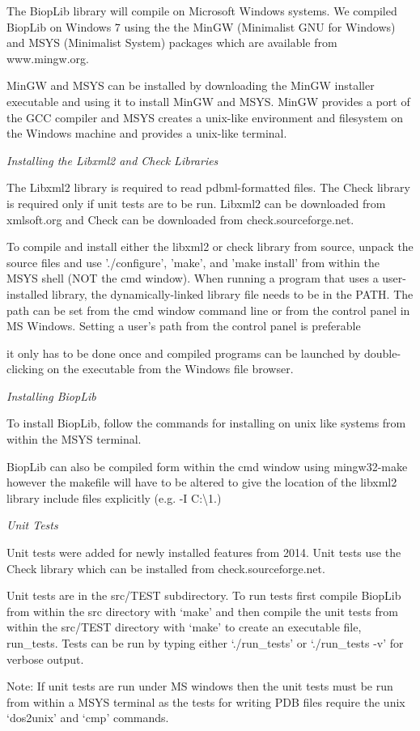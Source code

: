 The Biop\-Lib library will compile on Microsoft Windows systems. We compiled Biop\-Lib on Windows 7 using the the Min\-G\-W (Minimalist G\-N\-U for Windows) and M\-S\-Y\-S (Minimalist System) packages which are available from www.\-mingw.\-org.

Min\-G\-W and M\-S\-Y\-S can be installed by downloading the Min\-G\-W installer executable and using it to install Min\-G\-W and M\-S\-Y\-S. Min\-G\-W provides a port of the G\-C\-C compiler and M\-S\-Y\-S creates a unix-\/like environment and filesystem on the Windows machine and provides a unix-\/like terminal.

{\itshape Installing the Libxml2 and Check Libraries}

The Libxml2 library is required to read pdbml-\/formatted files. The Check library is required only if unit tests are to be run. Libxml2 can be downloaded from xmlsoft.\-org and Check can be downloaded from check.\-sourceforge.\-net.

To compile and install either the libxml2 or check library from source, unpack the source files and use './configure', 'make', and 'make install' from within the M\-S\-Y\-S shell (N\-O\-T the cmd window). When running a program that uses a user-\/installed library, the dynamically-\/linked library file needs to be in the P\-A\-T\-H. The path can be set from the cmd window command line or from the control panel in M\-S Windows. Setting a user's path from the control panel is preferable
\begin{DoxyItemize}
\item it only has to be done once and compiled programs can be launched by double-\/clicking on the executable from the Windows file browser.
\end{DoxyItemize}

{\itshape Installing Biop\-Lib}

To install Biop\-Lib, follow the commands for installing on unix like systems from within the M\-S\-Y\-S terminal.

Biop\-Lib can also be compiled form within the cmd window using mingw32-\/make however the makefile will have to be altered to give the location of the libxml2 library include files explicitly (e.\-g. -\/\-I C\-:\textbackslash{}1.)

{\itshape Unit Tests}

Unit tests were added for newly installed features from 2014. Unit tests use the Check library which can be installed from check.\-sourceforge.\-net.

Unit tests are in the src/\-T\-E\-S\-T subdirectory. To run tests first compile Biop\-Lib from within the src directory with ‘make’ and then compile the unit tests from within the src/\-T\-E\-S\-T directory with ‘make’ to create an executable file, run\-\_\-tests. Tests can be run by typing either ‘./run\-\_\-tests’ or ‘./run\-\_\-tests -\/v’ for verbose output.

Note\-: If unit tests are run under M\-S windows then the unit tests must be run from within a M\-S\-Y\-S terminal as the tests for writing P\-D\-B files require the unix ‘dos2unix’ and ‘cmp’ commands. 